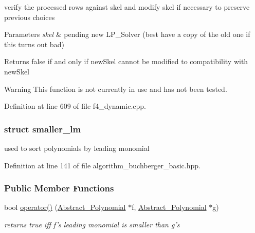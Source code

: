 verify the processed rows against {\ttfamily skel} and modify {\ttfamily skel} if necessary to preserve previous choices 


\begin{DoxyParams}{Parameters}
{\em skel} & pending new {\ttfamily L\+P\+\_\+\+Solver} (best have a copy of the old one if this turns out bad) \\
\hline
\end{DoxyParams}
\begin{DoxyReturn}{Returns}
{\ttfamily false} if and only if {\ttfamily new\+Skel} cannot be modified to compatibility with {\ttfamily new\+Skel} 
\end{DoxyReturn}
\begin{DoxyWarning}{Warning}
This function is not currently in use and has not been tested. 
\end{DoxyWarning}


Definition at line 609 of file f4\+\_\+dynamic.\+cpp.

\label{structsmaller__lm}
\subsubsection{struct smaller\+\_\+lm}
used to sort polynomials by leading monomial 

Definition at line 141 of file algorithm\+\_\+buchberger\+\_\+basic.\+hpp.

\subsubsection*{Public Member Functions}
\begin{DoxyCompactItemize}
\item 
bool \hyperlink{group___g_b_computation_a683ffd0302d029cd21c5bafdf4335785}{operator()} (\hyperlink{group__polygroup_class_abstract___polynomial}{Abstract\+\_\+\+Polynomial} $\ast$f, \hyperlink{group__polygroup_class_abstract___polynomial}{Abstract\+\_\+\+Polynomial} $\ast$g)
\begin{DoxyCompactList}\small\item\em returns {\ttfamily true} iff {\ttfamily f's} leading monomial is smaller than {\ttfamily g's} \end{DoxyCompactList}\end{DoxyCompactItemize}


